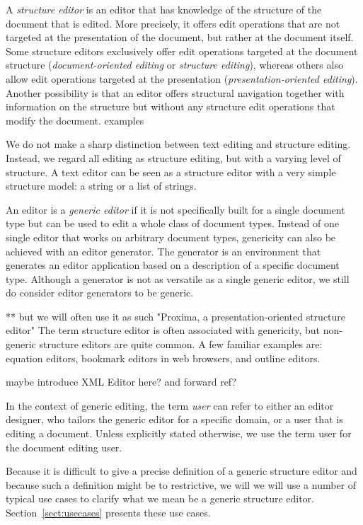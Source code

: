 A {\em structure editor} is an editor that has knowledge of the structure of the document that is edited. More precisely, it offers edit operations that are not targeted at the presentation of the document, but rather at the document itself. Some structure editors exclusively offer edit operations targeted at the document structure ({\em document-oriented editing} or {\em structure editing}), whereas others also allow edit operations targeted at the presentation ({\em presentation-oriented editing}). Another possibility is that an editor offers structural navigation together with information on the structure but without any structure edit operations that modify the document.
examples

We do not make a sharp distinction between text editing and structure editing. Instead, we regard all editing as structure editing, but with a varying level of structure. A text editor can be seen as a structure editor with a very simple structure model: a string or a list of strings. 

An editor is a {\em generic editor} if it is not specifically built for a single document type but can be used to edit a whole class of document types. Instead of one single editor that works on arbitrary document types, genericity can also be achieved with an editor generator. The generator is an environment that generates an editor application based on a description of a specific document type. Although a generator is not as versatile as a single generic editor, we still do consider editor generators to be generic. 

** but we will often use it as such "Proxima, a presentation-oriented structure editor"
The term structure editor is often associated with genericity, but non-generic structure editors are quite common. A few familiar examples are: equation editors, bookmark editors in web browsers, and outline editors.


maybe introduce XML Editor here? and forward ref?


In the context of generic editing, the term {\em user} can refer to either an editor designer, who tailors the generic editor for a specific domain, or a user that is editing a document. Unless explicitly stated otherwise, we use the term user for the document editing user.

Because it is difficult to give a precise definition of a generic structure editor and because such a definition might be to restrictive, we will we will use a number of typical use cases to clarify what we mean be a generic structure editor. Section~\ref{sect:usecases} presents these use cases.

